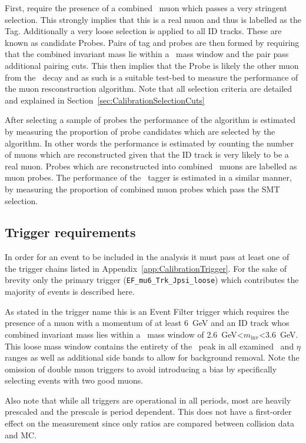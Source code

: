 First, require the presence of a combined \staco\ muon which passes a very stringent selection. This strongly implies that this is a real muon and thus is labelled as the Tag. Additionally a very loose selection is applied to all ID tracks. These are known as candidate Probes. Pairs of tag and probes are then formed by requiring that the combined invariant mass lie within a \jpsi\ mass window and the pair pass additional pairing cuts. This then implies that the Probe is likely the other muon from the \jpsi\ decay and as such is a suitable test-bed to measure the performance of the muon resconstruction algorithm. Note that all selection criteria are detailed and explained in Section~\ref{sec:CalibrationSelectionCuts}

After selecting a sample of probes the performance of the algorithm is estimated by measuring the proportion of probe candidates which are selected by the algorithm. In other words the performance is estimated by counting the number of muons which are reconstructed given that the ID track is very likely to be a real muon. Probes which are reconstructed into combined \staco\ muons are labelled as muon probes. The performance of the \xsm\ tagger is estimated in a similar manner, by measuring the proportion of combined muon probes which pass the SMT selection.

\subsection{Trigger requirements} \label{sec:CalibrationTriggerRequirement}
In order for an event to be included in the analysis it must pass at least one of the trigger chains listed in Appendix~\ref{app:CalibrationTrigger}. For the sake of brevity only the primary trigger (\verb|EF_mu6_Trk_Jpsi_loose|) which contributes the majority of events is described here.

As stated in the trigger name this is an Event Filter trigger which requires the presence of a muon with a momentum of at least \SI{6}{GeV} and an ID track whos combined invariant mass lies within a \jpsi\ mass window of \SI{2.6}{GeV}<$m_{\textrm{inv}}$<\SI{3.6}{GeV}. This loose mass window contains the entirety of the \jpsi\ peak in all examined \pt\ and $\eta$ ranges as well as additional side bands to allow for background removal. Note the omission of double muon triggers to avoid introducing a bias by specifically selecting events with two good muons. 

Also note that while all triggers are operational in all periods, most are heavily prescaled and the prescale is period dependent. This does not have a first-order effect on the measurement since only ratios are compared between collision data and MC.

